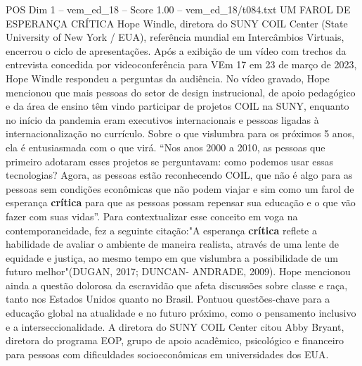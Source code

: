 \begin{textsample}{POS Dim 1 – vem\_ed\_18 – Score 1.00 – vem\_ed\_18/t084.txt}  \label{ex:f1_pos_034}
UM FAROL DE ESPERANÇA CRÍTICA Hope Windle, diretora do SUNY COIL Center (State University of New York / EUA), referência mundial em Intercâmbios Virtuais, encerrou o ciclo de apresentações.
Após a exibição de um vídeo com trechos da entrevista concedida por videoconferência para VEm 17 em 23 de março de 2023, Hope Windle respondeu a perguntas da audiência.
No vídeo gravado, Hope mencionou que mais pessoas do setor de design instrucional, de apoio pedagógico e da área de ensino têm vindo participar de projetos COIL na SUNY, enquanto no início da pandemia eram executivos internacionais e pessoas ligadas à internacionalização no currículo.
Sobre o que vislumbra para os próximos 5 anos, ela é entusiasmada com o que virá. “Nos anos 2000 a 2010, as pessoas que primeiro adotaram esses projetos se perguntavam: como podemos usar essas tecnologias?
Agora, as pessoas estão reconhecendo COIL, que não é algo para as pessoas sem condições econômicas que não podem viajar e sim como um farol de esperança \textbf{crítica} para que as pessoas possam repensar sua educação e o que vão fazer com suas vidas”.
Para contextualizar esse conceito em voga na contemporaneidade, fez a seguinte citação:"A esperança \textbf{crítica} reflete a habilidade de avaliar o ambiente de maneira realista, através de uma lente de equidade e justiça, ao mesmo tempo em que vislumbra a possibilidade de um futuro melhor"(DUGAN, 2017; DUNCAN- ANDRADE, 2009).
Hope mencionou ainda a questão dolorosa da escravidão que afeta discussões sobre classe e raça, tanto nos Estados Unidos quanto no Brasil.
Pontuou questões-chave para a educação global na atualidade e no futuro próximo, como o pensamento inclusivo e a interseccionalidade.
A diretora do SUNY COIL Center citou Abby Bryant, diretora do programa EOP, grupo de apoio acadêmico, psicológico e financeiro para pessoas com dificuldades socioeconômicas em universidades dos EUA.

\end{textsample}

